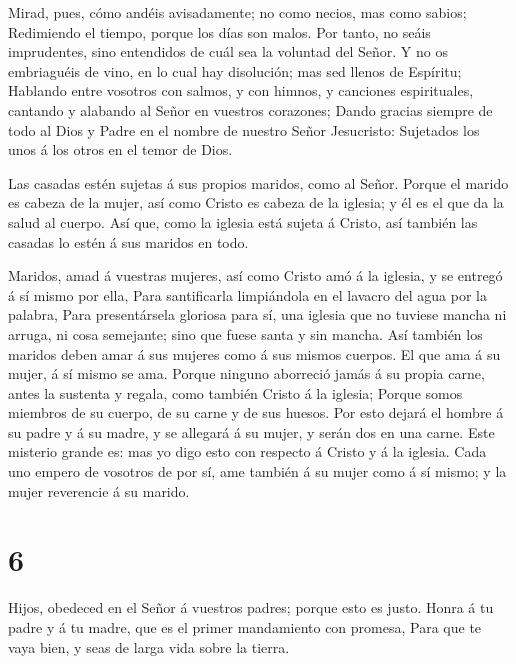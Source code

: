  Mirad, pues, cómo andéis avisadamente; no como necios, mas
como sabios;  Redimiendo el tiempo, porque los días son
malos.  Por tanto, no seáis imprudentes, sino entendidos de
cuál sea la voluntad del Señor.  Y no os embriaguéis de
vino, en lo cual hay disolución; mas sed llenos de Espíritu;
 Hablando entre vosotros con salmos, y con himnos, y
canciones espirituales, cantando y alabando al Señor en vuestros
corazones;  Dando gracias siempre de todo al Dios y Padre
en el nombre de nuestro Señor Jesucristo:  Sujetados los
unos á los otros en el temor de Dios.

 Las casadas estén sujetas á sus propios maridos, como al
Señor.  Porque el marido es cabeza de la mujer, así como
Cristo es cabeza de la iglesia; y él es el que da la salud al cuerpo.
 Así que, como la iglesia está sujeta á Cristo, así también
las casadas lo estén á sus maridos en todo.

 Maridos, amad á vuestras mujeres, así como Cristo amó á la
iglesia, y se entregó á sí mismo por ella,  Para
santificarla limpiándola en el lavacro del agua por la palabra,
 Para presentársela gloriosa para sí, una iglesia que no
tuviese mancha ni arruga, ni cosa semejante; sino que fuese santa y sin
mancha.  Así también los maridos deben amar á sus mujeres
como á sus mismos cuerpos. El que ama á su mujer, á sí mismo se ama.
 Porque ninguno aborreció jamás á su propia carne, antes la
sustenta y regala, como también Cristo á la iglesia; 
Porque somos miembros de su cuerpo, de su carne y de sus huesos.
 Por esto dejará el hombre á su padre y á su madre, y se
allegará á su mujer, y serán dos en una carne.  Este
misterio grande es: mas yo digo esto con respecto á Cristo y á la
iglesia.  Cada uno empero de vosotros de por sí, ame
también á su mujer como á sí mismo; y la mujer reverencie á su marido.

\hypertarget{section-5}{%
\section{6}\label{section-5}}

 Hijos, obedeced en el Señor á vuestros padres; porque esto
es justo.  Honra á tu padre y á tu madre, que es el primer
mandamiento con promesa,  Para que te vaya bien, y seas de
larga vida sobre la tierra.


